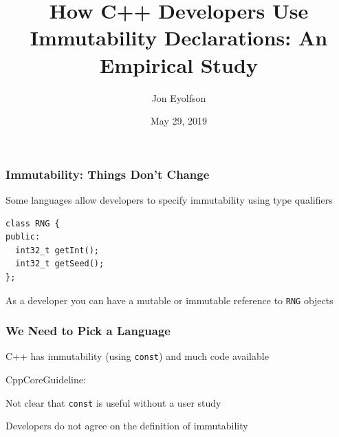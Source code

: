 \documentclass[aspectratio=169]{beamer}
\title{How C++ Developers Use Immutability Declarations: An Empirical Study}
\date{May 29, 2019}
\author{Jon Eyolfson}
\begin{document}
  \begin{frame}[plain]
    \titlepage
  \end{frame}

  \setcounter{framenumber}{0}

  \begin{frame}[fragile]
    \frametitle{Immutability: Things Don't Change}

    Some languages allow developers to specify immutability using type
    qualifiers
    \begin{lstlisting}[xleftmargin=1cm]
class RNG {
public:
  int32_t getInt();
  int32_t getSeed();
};
    \end{lstlisting}

    As a developer you can have a mutable or immutable reference to \texttt{RNG}
    objects

    \vspace{4em}

  \end{frame}

  \begin{frame}
    \frametitle{We Need to Pick a Language}

    C++ has immutability (using \texttt{const}) and much code available

    \vspace{1em}

    \hspace{1em} CppCoreGuideline: 

    \vspace{4em}

    Not clear that \texttt{const} is useful without a user study

    \vspace{1em}

    \hspace{1em} Developers do not agree on the definition of immutability
  \end{frame}
\end{document}
